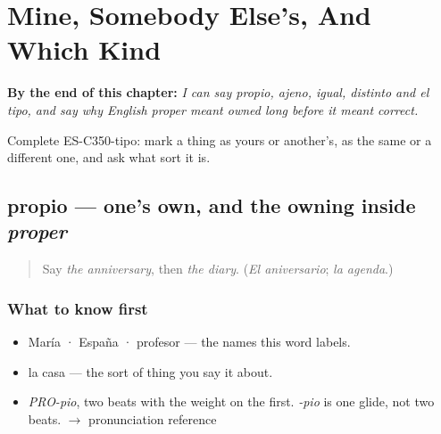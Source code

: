 
\chapter{Mine, Somebody Else's, And Which Kind}
\label{ch:propio-y-ajeno}

\begin{chapteropening}
\textbf{By the end of this chapter:} \emph{I can say propio, ajeno, igual, distinto and el tipo, and say why English proper meant owned long before it meant correct.}

Complete ES-C350-tipo: mark a thing as yours or another's, as the same or a different one, and ask what sort it is.
\end{chapteropening}

\section[propio]{propio — one's own, and the owning inside \emph{proper}}

\label{lesson:ES-C350-propio}



\begin{quote}
Say \emph{the anniversary}, then \emph{the diary}. (\emph{El aniversario}; \emph{la agenda}.)
\end{quote}

\subsection*{What to know first}
\begin{itemize}
\raggedright
  \item María · España · profesor — the names this word labels.
  \item la casa — the sort of thing you say it about.
\end{itemize}

\begin{sounds}
\begin{itemize}
\raggedright
  \item \emph{PRO-pio}, two beats with the weight on the first. \emph{-pio} is one glide, not two beats. $\to$ pronunciation reference
\end{itemize}
\end{sounds}

